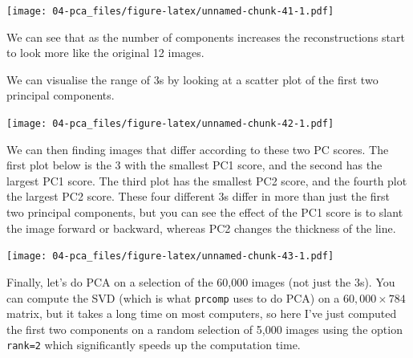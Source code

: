 \documentclass[
]{book}
\newenvironment{Shaded}{\begin{snugshade}}{\end{snugshade}}
\newcommand{\CommentTok}[1]{\textcolor[rgb]{0.56,0.35,0.01}{\textit{#1}}}
\newcommand{\DecValTok}[1]{\textcolor[rgb]{0.00,0.00,0.81}{#1}}
\newcommand{\FunctionTok}[1]{\textcolor[rgb]{0.00,0.00,0.00}{#1}}
\newcommand{\NormalTok}[1]{#1}
\newcommand{\OtherTok}[1]{\textcolor[rgb]{0.56,0.35,0.01}{#1}}
\newcommand{\SpecialCharTok}[1]{\textcolor[rgb]{0.00,0.00,0.00}{#1}}
\theoremstyle{definition}
\theoremstyle{definition}
\theoremstyle{definition}
\theoremstyle{definition}
\theoremstyle{remark}
\begin{document}
\texttt{[image: 04-pca\_files/figure-latex/unnamed-chunk-41-1.pdf]}

We can see that as the number of components increases the reconstructions start to look more like the original 12 images.

We can visualise the range of 3s by looking at a scatter plot of the first two principal components.

\begin{Shaded}
\end{Shaded}

\texttt{[image: 04-pca\_files/figure-latex/unnamed-chunk-42-1.pdf]}

We can then finding images that differ according to these two PC scores. The first plot below is the 3 with the smallest PC1 score, and the second has the largest PC1 score. The third plot has the smallest PC2 score, and the fourth plot the largest PC2 score.
These four different 3s differ in more than just the first two principal components, but you can see the effect of the PC1 score is to slant the image forward or backward, whereas PC2 changes the thickness of the line.

\begin{Shaded}
\end{Shaded}

\texttt{[image: 04-pca\_files/figure-latex/unnamed-chunk-43-1.pdf]}

Finally, let's do PCA on a selection of the 60,000 images (not just the 3s). You can compute the SVD (which is what \texttt{prcomp} uses to do PCA) on a \(60,000 \times 784\) matrix, but it takes a long time on most computers, so here I've just computed the first two components on a random selection of 5,000 images using the option \texttt{rank=2} which significantly speeds up the computation time.
\end{document}
